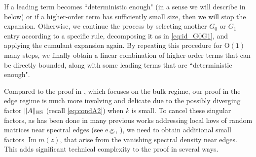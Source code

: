 \documentclass[10pt,reqno]{amsart}
\numberwithin{equation}{section}
\numberwithin{figure}{section}
\theoremstyle{plain} %
\theoremstyle{definition} %
\renewcommand{\txt}[1]{\text{\rm{#1}}}
\newcommand{\pa}[1]{\left({#1}\right)}
\DeclareMathOperator{\im}{\mathrm{Im}}
\newcommand{\OO}{\mathrm{O}}
\newcommand{\HS}{\txt{HS}}
\numberwithin{equation}{section}
\begin{document}
If a leading term becomes ``deterministic enough" (in a sense we will describe in  below) or if a higher-order term has sufficiently small size, then we will stop the expansion. 
Otherwise, we continue the process by selecting another $G_0$ or $G_1$ entry according to a specific rule, decomposing it as in \eqref{eq:id_G0G1}, and applying the cumulant expansion again.  
By repeating this procedure for $\OO(1)$ many steps, we finally obtain a linear combination of higher-order terms that can be directly bounded, along with some leading terms that are ``deterministic enough".  




Compared to the proof in \cite{stone2024randommatrixmodelquantum}, which focuses on the bulk regime, our proof in the edge regime is much more involving and delicate due to the possibly diverging factor $\|A\|_{\HS}$ (recall \eqref{eq:condA2}) when $k$ is small. To cancel these singular factors, as has been done in many previous works addressing local laws of random matrices near spectral edges (see e.g., \cite{erdHos2012rigidity}),  
we need to obtain additional small factors $\im m(z)$, that arise from the vanishing spectral density near edges. This adds significant technical complexity to the proof in several ways.
\end{document}
